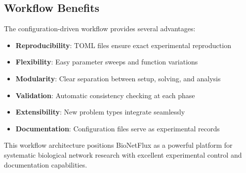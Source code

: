 \subsection{Workflow Benefits}

The configuration-driven workflow provides several advantages:

\begin{itemize}
    \item \textbf{Reproducibility}: TOML files ensure exact experimental reproduction
    \item \textbf{Flexibility}: Easy parameter sweeps and function variations
    \item \textbf{Modularity}: Clear separation between setup, solving, and analysis
    \item \textbf{Validation}: Automatic consistency checking at each phase
    \item \textbf{Extensibility}: New problem types integrate seamlessly
    \item \textbf{Documentation}: Configuration files serve as experimental records
\end{itemize}

This workflow architecture positions BioNetFlux as a powerful platform for systematic biological network research with excellent experimental control and documentation capabilities.

